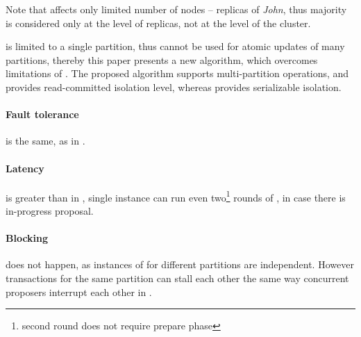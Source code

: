 Note that \lwt affects only limited number of nodes -- replicas of \emph{John}, thus majority is considered only at the level of replicas, not at the level of the cluster.

\lwt is limited to a single partition, thus \lwt cannot be used for atomic updates of many partitions, thereby this paper presents a new algorithm, which overcomes limitations of \lwt.
The proposed algorithm supports multi-partition operations, and provides read-committed isolation level, whereas \lwt provides serializable isolation.

\paragraph{Fault tolerance} is the same, as in \paxos.

\paragraph{Latency} is greater than in \paxos, single \lwt instance can run even two\footnote{second round does not require prepare phase} rounds of \paxos, in case there is in-progress proposal.

\paragraph{Blocking} does not happen, as instances of \lwt for different partitions are independent. However \lwt transactions for the same partition can stall each other the same way concurrent proposers interrupt each other in \paxos.

